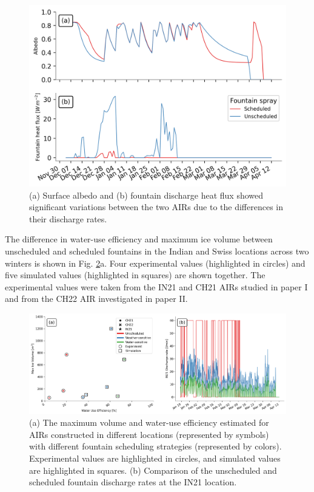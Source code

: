 \begin{figure}[htb]
	\includegraphics[width=\textwidth]{figs/dis_processes.png}
	\caption{(a) Surface albedo  and (b) fountain discharge heat flux showed significant variations between the two
		\ac{AIRs} due to the differences in their discharge rates.}
	\label{fig:dis_processes}
\end{figure}

The difference in water-use efficiency and maximum ice volume between unscheduled and scheduled fountains in the
Indian and Swiss locations across two winters is shown in Fig. \ref{fig:wue}a. Four experimental values
(highlighted in circles) and five simulated values (highlighted in squares) are shown together. The
experimental values were taken from the IN21 and CH21 AIRs studied in paper I and from the CH22 AIR investigated in
paper II.

\begin{figure}[htb]
	\includegraphics[width=\textwidth]{figs/wue.png}

	\caption{(a) The maximum volume and water-use efficiency estimated for AIRs constructed in different locations
		(represented by symbols) with different fountain scheduling strategies (represented by colors). Experimental
		values are highlighted in circles, and simulated values are highlighted in squares. (b) Comparison of
		the unscheduled and scheduled fountain discharge rates at the IN21 location.}

	\label{fig:wue}
\end{figure}

